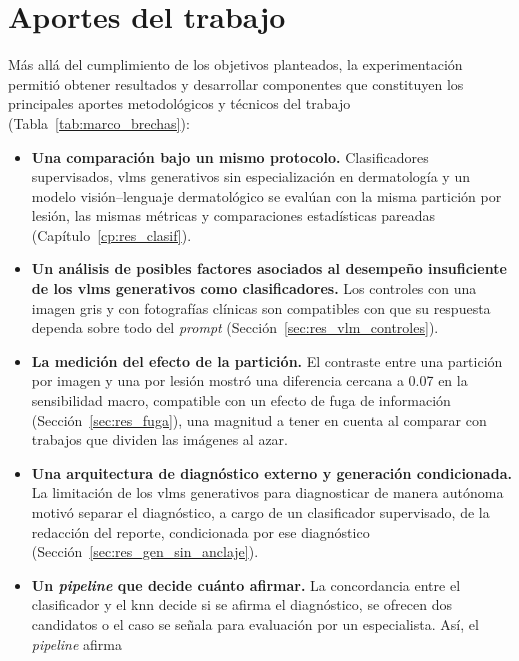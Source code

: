 \section{Aportes del trabajo}
\label{sec:concl_aportes}

Más allá del cumplimiento de los objetivos planteados, la experimentación permitió obtener resultados y desarrollar componentes que constituyen los principales aportes metodológicos y técnicos del trabajo (Tabla~\ref{tab:marco_brechas}):
\begin{itemize}
    \item \textbf{Una comparación bajo un mismo protocolo.} Clasificadores supervisados, \glspl{vlm} generativos sin especialización en dermatología y un modelo visión--lenguaje dermatológico se evalúan con la misma partición por lesión, las
    mismas métricas y comparaciones estadísticas pareadas (Capítulo~\ref{cp:res_clasif}).
    \item \textbf{Un análisis de posibles factores asociados al desempeño insuficiente de los \glspl{vlm} generativos como
    clasificadores.} Los controles con una imagen gris y con fotografías clínicas son compatibles con que su respuesta
    dependa sobre todo del \emph{prompt}
    (Sección~\ref{sec:res_vlm_controles}).
    \item \textbf{La medición del efecto de la partición.} El contraste entre una partición por imagen y una por lesión mostró una diferencia cercana a 0.07 en la sensibilidad macro, compatible con un efecto de fuga de información (Sección~\ref{sec:res_fuga}), una magnitud a tener en cuenta al
    comparar con trabajos que dividen las imágenes al azar.
    \item \textbf{Una arquitectura de diagnóstico externo y generación condicionada.} La limitación de los \glspl{vlm}
    generativos para diagnosticar de manera autónoma motivó separar el diagnóstico, a cargo de un clasificador
    supervisado, de la redacción del reporte, condicionada por ese diagnóstico (Sección~\ref{sec:res_gen_sin_anclaje}).
    \item \textbf{Un \emph{pipeline} que decide cuánto afirmar.} La concordancia entre el clasificador y el \gls{knn}
    decide si se afirma el diagnóstico, se ofrecen dos candidatos o el caso se señala para evaluación por un especialista. Así, el \emph{pipeline} afirma

\end{itemize}
